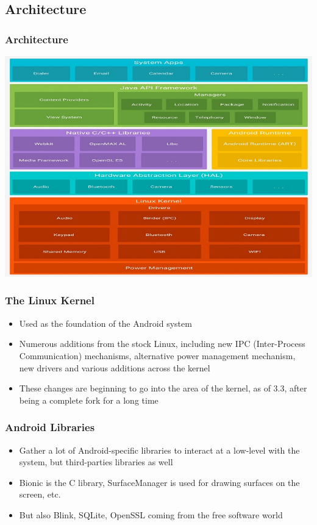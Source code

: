 \subsection{Architecture}
\begin{frame}
  \frametitle{Architecture}
  \begin{center}
    \includegraphics[width=\textwidth]{slides/android-introduction-architecture/architecture_1.jpg}
  \end{center}
\end{frame}

\begin{frame}
  \frametitle{The Linux Kernel}
  \begin{itemize}
  \item Used as the foundation of the Android system
  \item Numerous additions from the stock Linux, including new IPC (Inter-Process Communication) mechanisms,
    alternative power management mechanism, new drivers and various
    additions across the kernel
  \item These changes are beginning to go into the 
    area of the kernel, as of 3.3, after being a complete fork for a
    long time
  \end{itemize}
\end{frame}

\begin{frame}
  \frametitle{Android Libraries}
  \begin{itemize}
  \item Gather a lot of Android-specific libraries to interact at a
    low-level with the system, but third-parties libraries as well
  \item Bionic is the C library, SurfaceManager is used for drawing
    surfaces on the screen, etc.
  \item But also Blink, SQLite, OpenSSL coming from the free software
    world
  \end{itemize}
\end{frame}

